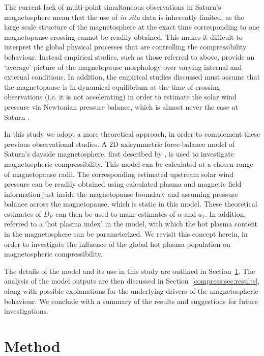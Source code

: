 The current lack of multi-point simultaneous observations in Saturn's magnetosphere mean that the use of \textit{in situ} data is inherently limited, as the large scale structure of the magnetosphere at the exact time corresponding to one magnetopause crossing cannot be readily obtained. This makes it difficult to interpret the global physical processes that are controlling the compressibility behaviour. Instead empirical studies, such as those referred to above, provide an `average' picture of the magnetopause morphology over varying internal and external conditions. In addition, the empirical studies discussed must assume that the magnetopause is in dynamical equilibrium at the time of crossing observations (i.e. it is not accelerating) in order to estimate the solar wind pressure via Newtonian pressure balance, which is almost never the case at Saturn \cite[e.g.][]{dougherty2005,masters2011,pilkington2015}.

In this study we adopt a more theoretical approach, in order to complement these previous observational studies. A 2D axisymmetric force-balance model of Saturn's dayside magnetosphere, first described by \citet{achilleos2010a}, is used to investigate magnetospheric compressibility. This model can be calculated at a chosen range of magnetopause radii. The corresponding estimated upstream solar wind pressure can be readily obtained using calculated plasma and magnetic field information just inside the magnetopause boundary and assuming pressure balance across the magnetopause, which is static in this model. These theoretical estimates of $D_\mathrm{P}$ can then be used to make estimates of $\alpha$ and $a_1$. In addition, \citet{achilleos2010a} referred to a `hot plasma index' in the model, with which the hot plasma content in the magnetosphere can be parameterized. We revisit this concept herein, in order to investigate the influence of the global hot plasma population on magnetospheric compressibility.

The details of the model and its use in this study are outlined in Section~\ref{compress:sec:method}. The analysis of the model outputs are then discussed in Section~\ref{compress:sec:results}, along with possible explanations for the underlying drivers of the magnetospheric behaviour. We conclude with a summary of the results and suggestions for future investigations.

\section{Method}\label{compress:sec:method}
